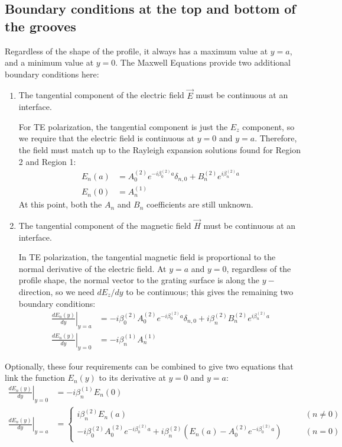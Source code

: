 \subsection{Boundary conditions at the top and bottom of the grooves}
Regardless of the shape of the profile, it always has a maximum value at $y=a$, and a minimum value at $y=0$.  The Maxwell Equations provide two additional boundary conditions here:
\begin{enumerate}
\item The tangential component of the electric field $\vec E$ must be continuous at an interface.

For TE polarization, the tangential component is just the $E_z$ component, so we require that the electric field is continuous at $y=0$ and $y=a$.  Therefore, the field must match up to the Rayleigh expansion solutions found for Region 2 and Region 1:
\begin{align}
\label{boundsA1}
E_n(a) &= A_0^{(2)} e^{-i \beta_0^{(2)} a} \delta_{n,0} + B_n^{(2)} e^{i \beta_n^{(2)}a} \\
\label{bounds01}
E_n(0) &= A_n^{(1)}
\end{align}
At this point, both the $A_n$ and $B_n$ coefficients are still unknown.

\item The tangential component of the magnetic field $\vec H$ must be continuous at an interface.

In TE polarization, the tangential magnetic field is proportional to the normal derivative of the electric field.  At $y=a$ and $y=0$, regardless of the profile shape, the normal vector to the grating surface is along the $y-$direction, so we need $dE_z/dy$ to be continuous; this gives the remaining two boundary conditions:
\begin{align}
\label{boundsA2}
\left. \frac{d E_n(y)}{dy} \right|_{y=a} &= -i \beta_0^{(2)} A_0^{(2)} e^{-i\beta_0^{(2)}a} \delta_{n,0} + i \beta_n^{(2)} B_n^{(2)} e^{i \beta_n^{(2)}a} \\
\label{bounds02}
\left. \frac{d E_n(y)}{dy} \right|_{y=0} &= - i \beta_n^{(1)} A_n^{(1)}
\end{align}

\end{enumerate}

Optionally, these four requirements can be combined to give two equations that link the function $E_n(y)$ to its derivative at $y=0$ and $y=a$:
\begin{align}
\left. \frac{dE_n(y)}{dy} \right|_{y=0} &= - i \beta_n^{(1)} E_n(0)\\
\left. \frac{d E_n(y)}{dy} \right|_{y=a} &=  \left\{   \begin{array}{cl}      i \beta_n^{(2)} E_n(a)   &\qquad (n\neq 0)  \\ -i \beta_0^{(2)} A_0^{(2)} e^{-i\beta_0^{(2)}a}  + i \beta_n^{(2)} \left( E_n(a) - A_0^{(2)} e^{-i \beta_0^{(2)} a} \right)  &\qquad (n=0)  \end{array}   \right.
\end{align}


